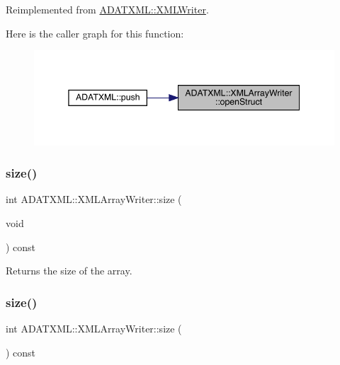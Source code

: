 Reimplemented from \mbox{\hyperlink{classADATXML_1_1XMLWriter_a8f9728743acfd9c15ab5d69bf8800a5e}{A\+D\+A\+T\+X\+M\+L\+::\+X\+M\+L\+Writer}}.

Here is the caller graph for this function\+:\nopagebreak
\begin{figure}[H]
\begin{center}
\leavevmode
\includegraphics[width=345pt]{dc/df3/classADATXML_1_1XMLArrayWriter_af1602cb14d54aa8e42442f2784c00e22_icgraph}
\end{center}
\end{figure}
\mbox{\label{classADATXML_1_1XMLArrayWriter_a152ffb3695b1f644614a7ca7ca86efa0}} 
\subsubsection{\texorpdfstring{size()}{size()}\hspace{0.1cm}{\footnotesize\ttfamily [1/2]}}
{\footnotesize\ttfamily int A\+D\+A\+T\+X\+M\+L\+::\+X\+M\+L\+Array\+Writer\+::size (\begin{DoxyParamCaption}\item[{void}]{ }\end{DoxyParamCaption}) const\hspace{0.3cm}{\ttfamily [inline]}}



Returns the size of the array. 

\mbox{\label{classADATXML_1_1XMLArrayWriter_a152ffb3695b1f644614a7ca7ca86efa0}} 
\subsubsection{\texorpdfstring{size()}{size()}\hspace{0.1cm}{\footnotesize\ttfamily [2/2]}}
{\footnotesize\ttfamily int A\+D\+A\+T\+X\+M\+L\+::\+X\+M\+L\+Array\+Writer\+::size (\begin{DoxyParamCaption}{ }\end{DoxyParamCaption}) const\hspace{0.3cm}{\ttfamily [inline]}}



